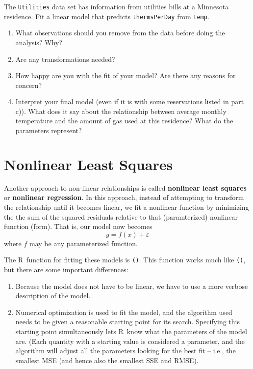 \documentclass[twoside]{book}\usepackage[]{graphicx}\usepackage[]{xcolor}
\newcommand{\variable}[1]{{\color{green!50!black}\texttt{#1}}}
\newcommand{\Rindex}[1]{\index{\texttt{#1}}}
\newcommand{\dataframe}[1]{{\color{blue!80!black}\texttt{#1}}\Rindex{#1}}
\newcommand{\function}[1]{{\color{purple!75!blue}\texttt{\StrSubstitute{#1}{()}{}()}}\Rindex{#1}}
\def\R{{\sf R}}
\def\term#1{\textbf{#1}}
\begin{document}
\begin{problem}
\label{prob:utilities-therms-by-temp}%
\Rindex{utilities}%
The \dataframe{Utilities} data set has information from utilities
bills at a Minnesota residence.
Fit a linear model that predicts \variable{thermsPerDay} from \variable{temp}.
\begin{enumerate}
\item
What observations should you remove from the data before doing the 
analysis? Why?  
\item
Are any transformations needed?
\item
How happy are you with the fit of your model?  Are there any reasons
for concern?
\item
Interpret your final model (even if it is with some reservations listed in
part c)).  
What does it say about the relationship between average monthly temperature 
and the amount of gas used at this residence?  What do the parameters represent?
\end{enumerate}
\end{problem}


\section{Nonlinear Least Squares}

Another approach to non-linear relationships is called \term{nonlinear least squares}
or \term{nonlinear regression}.  In this approach, instead of attempting to transform
the relationship until it becomes linear, we fit a nonlinear function by minimizing the 
the sum of the squared residuals relative to that (paramterized) nonlinear
function (form).  That is, our model now becomes
\[
y = f(x) + \varepsilon
\]
where $f$ may be any parameterized function.

The \R\ function for fitting these
models is \function{nls()}.  This function works much like \function{lm()},
but there are some important differences:
	\begin{enumerate}
		\item
			Because the model does not have to be linear, we have
			to use a more verbose description of the model.
		\item
			Numerical optimization is used to fit the model, and the algorithm
			used needs to be given a reasonable starting point for its search.
			Specifying this starting point simultaneously lets \R\ know what the 
			parameters of the model are.  (Each quantity with a starting value
			is considered a parameter, and the algorithm will adjust all the parameters
			looking for the best fit -- i.e., the smallest MSE (and hence also
			the smallest SSE and RMSE).
	\end{enumerate}
\end{document}
